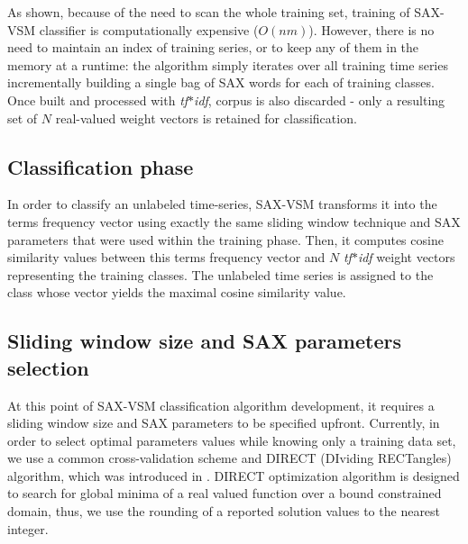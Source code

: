 As shown, because of the need to scan the whole training set, training of SAX-VSM 
classifier is computationally expensive ($O(nm)$). 
However, there is no need to maintain an index of training series, or to keep any of 
them in the memory at a runtime: the algorithm simply iterates over all training time 
series incrementally building a single bag of SAX words for each of training classes. 
Once built and processed with \textit{tf$\ast$idf}, corpus is also discarded - 
only a resulting set of $N$ real-valued weight vectors is retained for classification. 

\subsection{Classification phase}
In order to classify an unlabeled time-series, SAX-VSM transforms it into the 
terms frequency vector using exactly the same sliding window technique and SAX 
parameters that were used within the training phase. 
Then, it computes cosine similarity values between this terms frequency vector and 
$N$ \textit{tf$\ast$idf} weight vectors representing the training classes. 
The unlabeled time series is assigned to the class whose vector yields the maximal 
cosine similarity value.

\subsection{Sliding window size and SAX parameters selection} \label{section-direct}
At this point of SAX-VSM classification algorithm development, it requires a sliding 
window size and SAX parameters to be specified upfront. 
Currently, in order to select optimal parameters values while knowing only a 
training data set, we use a common cross-validation scheme and DIRECT (DIviding RECTangles) 
algorithm, which was introduced in \cite{citeulike:4210208}.
DIRECT optimization algorithm is designed to search for global minima of a real valued function 
over a bound constrained domain, thus, we use the rounding of a reported solution values 
to the nearest integer.

